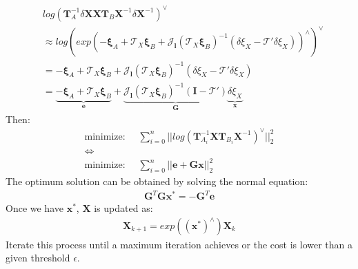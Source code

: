 \begin{align}
&log \left( \mathbf{T}_{A}^{-1}{\delta\mathbf{X}}\mathbf{X}\mathbf{T}_{B}\mathbf{X}^{-1}{\delta\mathbf{X}^{-1}} \right)^{\vee} \\
&\approx log
\left(
exp 
\left(
-{\mathbf{\xi}_A}+\mathcal{T}_X{\mathbf{\xi}_B} + \mathbf{\mathcal{J}_{l}}
\left(
\mathcal{T}_X{\mathbf{\xi}_B}
\right) ^{-1} 
\left( 
\delta \xi_{X} - \mathbf{\mathcal{T}}' \delta \xi_{X}
\right) 
\right)^{\wedge}
\right)^{\vee} \\
&=-{\mathbf{\xi}_A}+\mathcal{T}_X{\mathbf{\xi}_B} + \mathbf{\mathcal{J}_{l}}
\left(
\mathcal{T}_X{\mathbf{\xi}_B}
\right) ^{-1} 
\left( 
\delta \xi_{X} - \mathbf{\mathcal{T}}' \delta \xi_{X}
\right) \\
&=\underbrace{-{\mathbf{\xi}_A}+\mathcal{T}_X{\mathbf{\xi}_B}}_{\mathbf{e}} + \underbrace{\mathbf{\mathcal{J}_{l}}
\left(
\mathcal{T}_X{\mathbf{\xi}_B}
\right) ^{-1} 
\left( 
\mathbf{I} - \mathbf{\mathcal{T}}' 
\right)}_{\mathbf{G}} \underbrace{\delta \xi_{X}}_{\mathbf{x}}
\end{align}
Then:
\begin{align}
\text{minimize: }& \ \sum_{i=0}^{n} ||log\left( \mathbf{T}_{A_i}^{-1}\mathbf{X}\mathbf{T}_{B_i}\mathbf{X}^{-1} \right)^{\vee}||_2^2 \nonumber \\ \Leftrightarrow  \nonumber \\
\text{minimize: }& \ \sum_{i=0}^{n} ||\mathbf{e}+\mathbf{Gx}||_2^2
\end{align}
The optimum solution can be obtained by solving the normal equation:
\begin{align}
\mathbf{G}^T\mathbf{G}\mathbf{x}^*=-\mathbf{G}^T\mathbf{e}
\end{align}
Once we have $\mathbf{x}^*$, $\mathbf{X}$ is updated as:
\begin{align}
\mathbf{X}_{k+1}=exp\left(\left(\mathbf{x}^*\right)^{\wedge}\right)\mathbf{X}_k
\end{align}
Iterate this process until a maximum iteration achieves or the cost is lower than a given threshold $\epsilon$.


